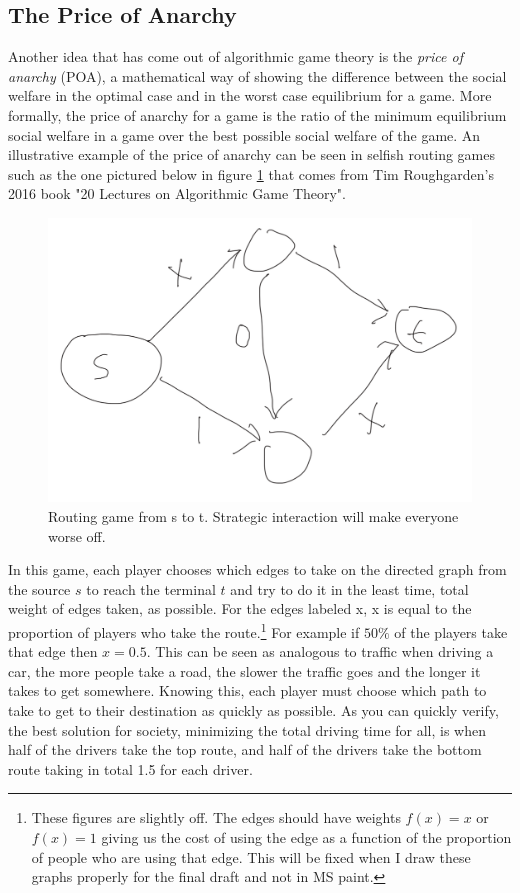 \documentclass[12pt,twoside]{reedthesis}
\begin{document}
\subsection{The Price of Anarchy}
Another idea that has come out of algorithmic game theory is the \textit{price of anarchy} (POA), a mathematical way of showing the difference between the social welfare in the optimal case and in the worst case equilibrium for a game. More formally, the price of anarchy for a game is the ratio of the minimum equilibrium social welfare in a game over the best possible social welfare of the game. An illustrative example of the price of anarchy can be seen in selfish routing games such as the one pictured below in figure \ref{braess} that comes from Tim Roughgarden's 2016 book "20 Lectures on Algorithmic Game Theory". 
\begin{figure}[h!]
	\centering
	\includegraphics[scale=0.4]{Figures/braess}
	\caption{Routing game from s to t. Strategic interaction will make everyone worse off.}
	\label{braess}
\end{figure}
In this game, each player chooses which edges to take on the directed graph from the source $s$ to reach the terminal $t$ and try to do it in the least time, total weight of edges taken, as possible. For the edges labeled x, x is equal to the proportion of players who take the route.\footnote{These figures are slightly off. The edges should have weights $f(x) = x$ or $f(x) = 1$ giving us the cost of using the edge as a function of the proportion of people who are using that edge. This will be fixed when I draw these graphs properly for the final draft and not in MS paint.}%
For example if $50 \%$ of the players take that edge then $x=0.5$. This can be seen as analogous to traffic when driving a car, the more people take a road, the slower the traffic goes and the longer it takes to get somewhere. Knowing this, each player must choose which path to take to get to their destination as quickly as possible. As you can quickly verify, the best solution for society, minimizing the total driving time for all, is when half of the drivers take the top route, and half of the drivers take the bottom route taking in total 1.5 for each driver. 
\end{document}
